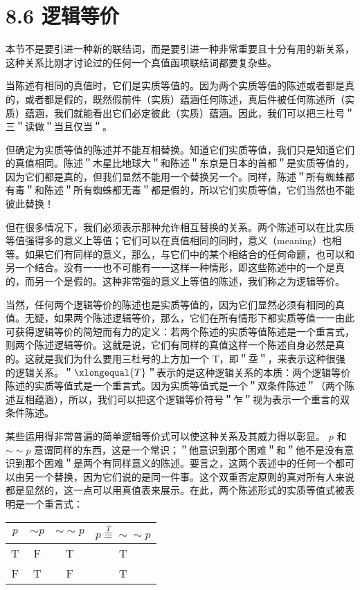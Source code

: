 \section*{8.6 逻辑等价}
本节不是要引进一种新的联结词，而是要引进一种非常重要且十分有用的新关系，这种关系比刚才讨论过的任何一个真值函项联结词都要复杂些。

当陈述有相同的真值时，它们是实质等值的。因为两个实质等值的陈述或者都是真的，或者都是假的，既然假前件（实质）蕴涵任何陈述，真后件被任何陈述所（实质）蕴涵，我们就能看出它们必定彼此（实质）蕴涵。因此，我们可以把三杜号＂三＂读做＂当且仅当＂。

但确定为实质等值的陈述并不能互相替换。知道它们实质等值，我们只是知道它们的真值相同。陈述＂木星比地球大＂和陈述＂东京是日本的首都＂是实质等值的，因为它们都是真的，但我们显然不能用一个替换另一个。同样，陈述＂所有蜘蛛都有毒＂和陈述＂所有蜘蛛都无毒＂都是假的，所以它们实质等值，它们当然也不能彼此替换！

但在很多情况下，我们必须表示那种允许相互替换的关系。两个陈述可以在比实质等值强得多的意义上等值；它们可以在真值相同的同时，意义（meaning）也相等。如果它们有同样的意义，那么，与它们中的某个相结合的任何命题，也可以和另一个结合。没有一一也不可能有一一这样一种情形，即这些陈述中的一个是真的，而另一个是假的。这种非常强的意义上等值的陈述，我们称之为逻辑等价。

当然，任何两个逻辑等价的陈述也是实质等值的，因为它们显然必须有相同的真值。无疑，如果两个陈述逻辑等价，那么，它们在所有情形下都实质等值一一由此可获得逻辑等价的简短而有力的定义：若两个陈述的实质等值陈述是一个重言式，则两个陈述逻辑等价。这就是说，它们有同样的真值这样一个陈述自身必然是真的。这就是我们为什么要用三杜号的上方加一个 T，即＂坖＂，来表示这种很强的逻辑关系。＂$\xlongequal{T}$＂表示的是这种逻辑关系的本质：两个逻辑等价陈述的实质等值式是一个重言式。因为实质等值式是一个＂双条件陈述＂（两个陈述互相蕴涵），所以，我们可以把这个逻辑等价符号＂乍＂视为表示一个重言的双条件陈述。

某些运用得非常普遍的简单逻辑等价式可以使这种关系及其威力得以彰显。 $p$ 和 $\sim \sim p$ 意谓同样的东西，这是一个常识；＂他意识到那个困难＂和＂他不是没有意识到那个困难＂是两个有同样意义的陈述。要言之，这两个表述中的任何一个都可以由另一个替换，因为它们说的是同一件事。这个双重否定原则的真对所有人来说都是显然的，这一点可以用真值表来展示。在此，两个陈述形式的实质等值式被表明是一个重言式：

\begin{center}
\begin{tabular}{|cccc|}
\hline
$p$ & $\sim p$ & $\sim \sim p$ & $p \stackrel{T}{\equiv} \sim \sim p$ \\
\hline
T & F & T & T \\
F & T & F & T \\
\hline
\end{tabular}
\end{center}

